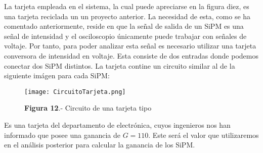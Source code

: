 La tarjeta empleada en el sistema, la cual puede apreciarse en la figura diez, es una tarjeta reciclada un un proyecto anterior. La necesidad de esta, como se ha comentado anteriormente, reside en que la señal de salida de un SiPM es una señal de intensidad y el osciloscopio únicamente puede trabajar con señales de voltaje. Por tanto, para poder analizar esta señal es necesario utilizar una tarjeta conversora de intensidad en voltaje. Esta consiste de dos entradas donde podemos conectar dos SiPM distintos. La tarjeta contine un circuito similar al de la siguiente imágen para cada SiPM:

\begin{figure}[hbtp]
\centering
\texttt{[image: CircuitoTarjeta.png]}
\caption{\textbf{Figura 12}.- Circuito de una tarjeta tipo}
\end{figure}


Es una tarjeta del departamento de electrónica, cuyos ingenieros nos han informado que posee una ganancia de $G=110$. Este será el valor que utilizaremos en el análisis posterior para calcular la ganancia de los SiPM.

